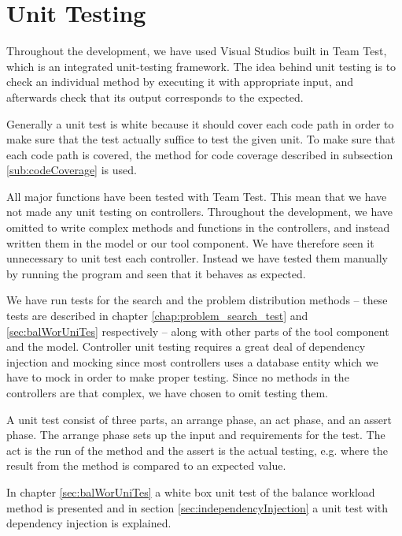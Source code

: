 \section{Unit Testing}
\label{chap:testing}
Throughout the development, we have used Visual Studios built in Team Test, which is an integrated unit-testing framework. \cite{teamtest}
The idea behind unit testing is to check an individual method by executing it with appropriate input, and afterwards check that its output corresponds to the expected.

Generally a unit test is white because it should cover each code path in order to make sure that the test actually suffice to test the given unit. \cite[p.~39]{williams06}
To make sure that each code path is covered, the method for code coverage described in subsection \ref{sub:codeCoverage} is used.

All major functions have been tested with Team Test. This mean that we have not made any unit testing on controllers. 
Throughout the development, we have omitted to write complex methods and functions in the controllers, and instead written them in the model or our tool component. We have therefore seen it unnecessary to unit test each controller. Instead we have tested them manually by running the program and seen that it behaves as expected. 

We have run tests for the search and the problem distribution methods -- these tests are described in chapter \ref{chap:problem_search_test} and \ref{sec:balWorUniTes} respectively -- along with other parts of the tool component and the model.
Controller unit testing requires a great deal of dependency injection and mocking since most controllers uses a database entity which we have to mock in order to make proper testing.
Since no methods in the controllers are that complex, we have chosen to omit testing them.

A unit test consist of three parts, an arrange phase, an act phase, and an assert phase. 
The arrange phase sets up the input and requirements for the test. 
The act is the run of the method and the assert is the actual testing, e.g. where the result from the method is compared to an expected value. 



In chapter \ref{sec:balWorUniTes} a white box unit test of the balance workload method is presented and in section \ref{sec:independencyInjection} a unit test with dependency injection is explained. 